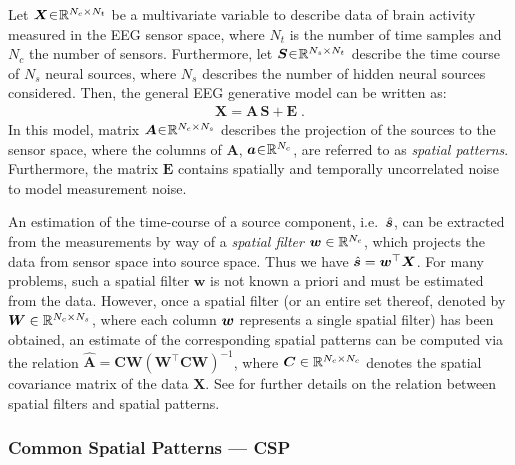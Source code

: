 \documentclass[10pt,a4paper, twocolumn]{article}
\providecommand{\mat}[1]{{\bm {#1}}}
\begin{document}
Let $\mat{X}\negmedspace\in\negmedspace \Real^{N_c \times N_t}$ be a multivariate variable to describe data of brain activity measured in the EEG sensor space, where $N_t$ is the number of time samples and $N_c$ the number of sensors. Furthermore, let $\mat{S} \negmedspace\in\negmedspace \Real^{N_s \times N_t}$ describe the time course of $N_s$ neural sources, where $N_s$ describes the number of hidden neural sources considered. Then, the general EEG generative model can be written as: 
\begin{align}\label{eq:genModel}
\mat{X}=\mat{A}\,\mat{S} + \mat{E} \;.
\end{align} 
In this model, matrix $\mat{A}\negmedspace\in\negmedspace \Real^{N_c \times N_s}$ describes the projection of the sources to the sensor space, where the columns of $\mat{A}$, ${\bm {a}} \negmedspace\in\negmedspace \mathbb{R}^{N_c}$, are referred to as \emph{spatial patterns}. Furthermore, the matrix $\mat{E}$ contains spatially and temporally uncorrelated noise to model measurement noise. 

An estimation of the time-course of a source component, i.e.\ $\hat{{\bm {s}}}$, can be extracted from the measurements by way of a \emph{spatial filter} ${\bm {w}} \in \mathbb{R}^{N_c}$, which projects the data from sensor space into source space. Thus we have $\hat{\ve{s}} = \ve{w}^\top\mat{X}$.
For many problems, such a spatial filter $\mat{w}$ is not known a priori and must be estimated from the data. However, once a spatial filter (or an entire set thereof, denoted by $\mat{W} \in \Real^{N_c \times N_s}$, where each column ${\bm {w}}$ represents a single spatial filter) has been obtained, an estimate of the corresponding spatial patterns can be computed via the relation $ \hat{\mat{A}} = \mat{C} \mat{W} \left( \mat{W}^\top \mat{C} \mat{W} \right)^{-1} $, where $\mat{C} \in  \Real^{N_c \times N_c} $ denotes the spatial covariance matrix of the data $\mat{X}$. See \cite{haufe2014interpretation} for further details on the relation between spatial filters and spatial patterns.  

\subsubsection{Common Spatial Patterns --- CSP}
\end{document}
